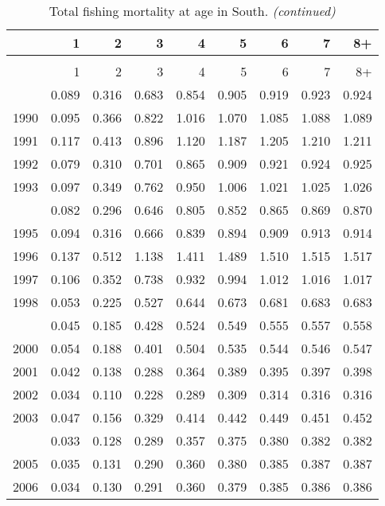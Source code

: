 \documentclass[
]{article}
\begin{document}
\begin{longtable}[t]{lrrrrrrrr}
\caption{\label{tab:South-region-FAA-table}Total fishing mortality at age in South.}\\
\toprule
  & 1 & 2 & 3 & 4 & 5 & 6 & 7 & 8+\\
\midrule
\endfirsthead
\caption[]{Total fishing mortality at age in South. \textit{(continued)}}\\
\toprule
  & 1 & 2 & 3 & 4 & 5 & 6 & 7 & 8+\\
\midrule
\endhead

\endfoot
\bottomrule
\endlastfoot
1989 & 0.089 & 0.316 & 0.683 & 0.854 & 0.905 & 0.919 & 0.923 & 0.924\\
1990 & 0.095 & 0.366 & 0.822 & 1.016 & 1.070 & 1.085 & 1.088 & 1.089\\
1991 & 0.117 & 0.413 & 0.896 & 1.120 & 1.187 & 1.205 & 1.210 & 1.211\\
1992 & 0.079 & 0.310 & 0.701 & 0.865 & 0.909 & 0.921 & 0.924 & 0.925\\
1993 & 0.097 & 0.349 & 0.762 & 0.950 & 1.006 & 1.021 & 1.025 & 1.026\\
\addlinespace
1994 & 0.082 & 0.296 & 0.646 & 0.805 & 0.852 & 0.865 & 0.869 & 0.870\\
1995 & 0.094 & 0.316 & 0.666 & 0.839 & 0.894 & 0.909 & 0.913 & 0.914\\
1996 & 0.137 & 0.512 & 1.138 & 1.411 & 1.489 & 1.510 & 1.515 & 1.517\\
1997 & 0.106 & 0.352 & 0.738 & 0.932 & 0.994 & 1.012 & 1.016 & 1.017\\
1998 & 0.053 & 0.225 & 0.527 & 0.644 & 0.673 & 0.681 & 0.683 & 0.683\\
\addlinespace
1999 & 0.045 & 0.185 & 0.428 & 0.524 & 0.549 & 0.555 & 0.557 & 0.558\\
2000 & 0.054 & 0.188 & 0.401 & 0.504 & 0.535 & 0.544 & 0.546 & 0.547\\
2001 & 0.042 & 0.138 & 0.288 & 0.364 & 0.389 & 0.395 & 0.397 & 0.398\\
2002 & 0.034 & 0.110 & 0.228 & 0.289 & 0.309 & 0.314 & 0.316 & 0.316\\
2003 & 0.047 & 0.156 & 0.329 & 0.414 & 0.442 & 0.449 & 0.451 & 0.452\\
\addlinespace
2004 & 0.033 & 0.128 & 0.289 & 0.357 & 0.375 & 0.380 & 0.382 & 0.382\\
2005 & 0.035 & 0.131 & 0.290 & 0.360 & 0.380 & 0.385 & 0.387 & 0.387\\
2006 & 0.034 & 0.130 & 0.291 & 0.360 & 0.379 & 0.385 & 0.386 & 0.386\\

\end{longtable}
\end{document}

